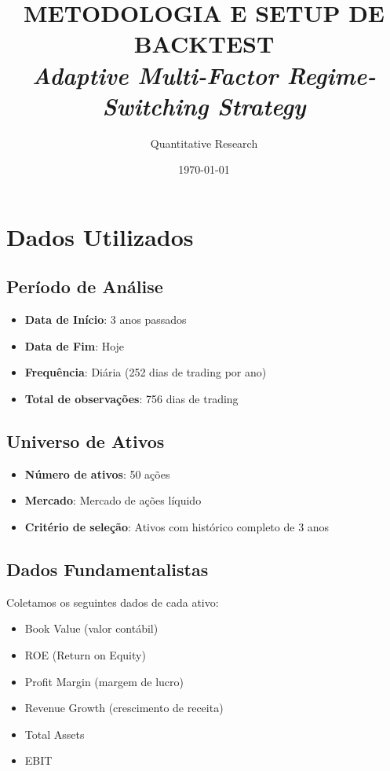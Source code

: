 \documentclass[12pt,a4paper]{article}
\title{\textbf{METODOLOGIA E SETUP DE BACKTEST}\\[0.5cm]
\textit{Adaptive Multi-Factor Regime-Switching Strategy}}
\author{Quantitative Research}
\date{\today}
\begin{document}
\maketitle

\section{Dados Utilizados}

\subsection{Período de Análise}

\begin{itemize}
    \item \textbf{Data de Início}: 3 anos passados
    \item \textbf{Data de Fim}: Hoje
    \item \textbf{Frequência}: Diária (252 dias de trading por ano)
    \item \textbf{Total de observações}: 756 dias de trading
\end{itemize}

\subsection{Universo de Ativos}

\begin{itemize}
    \item \textbf{Número de ativos}: 50 ações
    \item \textbf{Mercado}: Mercado de ações líquido
    \item \textbf{Critério de seleção}: Ativos com histórico completo de 3 anos
\end{itemize}

\subsection{Dados Fundamentalistas}

Coletamos os seguintes dados de cada ativo:
\begin{itemize}
    \item Book Value (valor contábil)
    \item ROE (Return on Equity)
    \item Profit Margin (margem de lucro)
    \item Revenue Growth (crescimento de receita)
    \item Total Assets
    \item EBIT
\end{itemize}
\end{document}
